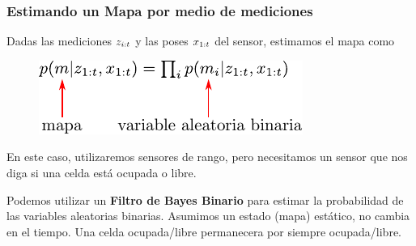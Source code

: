 \begin{frame}
	\frametitle{Estimando un Mapa por medio de mediciones}
	
	Dadas las mediciones $z_{i:t}$ y las poses $x_{1:t}$ del sensor, estimamos el mapa como
	
   	\begin{figure}[!h]
    \includegraphics[width=0.3\columnwidth]{./images/map_from_sensor_data.pdf}
    \end{figure}

    En este caso, utilizaremos sensores de rango, pero necesitamos un sensor que nos diga si una celda está ocupada o libre.
	
	
	Podemos utilizar un {\bf Filtro de Bayes Binario} para estimar la probabilidad de las variables aleatorias binarias. Asumimos un estado (mapa) estático, no cambia en el tiempo. Una celda ocupada/libre permanecera por siempre ocupada/libre.
	
\end{frame}

